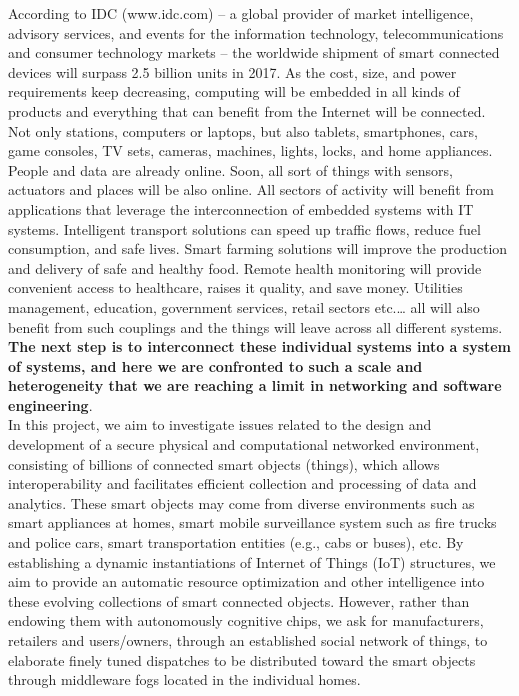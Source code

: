 
According to IDC (www.idc.com) -- a global provider of market intelligence, advisory services, and events for the information technology, telecommunications and consumer technology markets -- the worldwide shipment of smart connected devices will surpass 2.5 billion units in 2017. As the cost, size, and power requirements keep decreasing, computing will be embedded in all kinds of products and everything that can benefit from the Internet will be connected. Not only stations, computers or laptops, but also tablets, smartphones, cars, game consoles, TV sets, cameras, machines, lights, locks, and home appliances.\\

People and data are already online. Soon, all sort of things with sensors, actuators and places will be also online. All sectors of activity will benefit from applications that leverage the interconnection of embedded systems with IT systems. Intelligent transport solutions can speed up traffic flows, reduce fuel consumption, and safe lives. Smart farming solutions will improve the production and delivery of safe and healthy food. Remote health monitoring will provide convenient access to healthcare, raises it quality, and save money. Utilities management, education, government services, retail sectors etc.… all will also benefit from such couplings and the things will leave across all different systems. \textbf{The next step is to interconnect these individual systems into a system of systems, and here we are confronted to such a scale and heterogeneity that we are reaching a limit in networking and software engineering}.\\

In this project, we aim to investigate issues related to the design and development of a secure physical and computational networked environment, consisting of billions of connected smart objects (things), which allows interoperability and facilitates efficient collection and processing of data and analytics. These smart objects may come from diverse environments such as smart appliances at homes, smart mobile surveillance system such as fire trucks and police cars, smart transportation entities (e.g., cabs or buses), etc. By establishing a dynamic instantiations of Internet of Things (IoT) structures, we aim to  provide an automatic resource optimization and other intelligence into these evolving collections of smart connected objects. However, rather than endowing them with autonomously cognitive chips, we ask for manufacturers, retailers and users/owners, through an established social network of things, to elaborate finely tuned dispatches to be distributed toward the smart objects through middleware fogs located in the individual homes. \\

